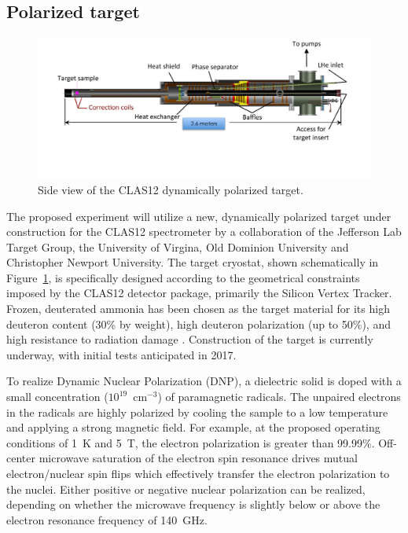 
\subsection{Polarized target}\label{poltar-section}
\begin{figure}
\begin{center}
\includegraphics[width=5.5in]{Target_Side.pdf}
\end{center}
\caption{Side view of the CLAS12 dynamically polarized target.}
\label{Target}
\end{figure}
The proposed experiment will utilize a new, dynamically polarized target under construction for the CLAS12 spectrometer by a collaboration of the Jefferson Lab Target Group, the University of Virgina, Old Dominion University and Christopher Newport University.  The target cryostat, shown schematically in Figure~\ref{Target}, is specifically designed according to the geometrical constraints imposed by the CLAS12 detector package, primarily the Silicon Vertex Tracker.  Frozen, deuterated ammonia has been chosen as the target material for its high deuteron content (30\% by weight), high deuteron polarization (up to 50\%), and high resistance to radiation damage \cite{Goertz2002}.  Construction of the target is currently underway, with initial tests anticipated in 2017.

To realize Dynamic Nuclear Polarization (DNP), a dielectric solid is doped with a small concentration 
($10^{19}$~cm$^{\minus3}$) of paramagnetic radicals.  The unpaired electrons in the radicals are highly polarized by cooling the sample to a low temperature and applying a strong magnetic field.  For example, at the proposed operating conditions of 1~K and 5~T, the electron polarization is greater than 99.99\%.  Off-center microwave saturation of the electron spin resonance drives mutual electron/nuclear spin flips which effectively transfer the electron polarization to the nuclei.  Either positive or negative nuclear polarization can be realized, depending on whether the microwave frequency is slightly below or above the electron resonance frequency of 140~GHz.

